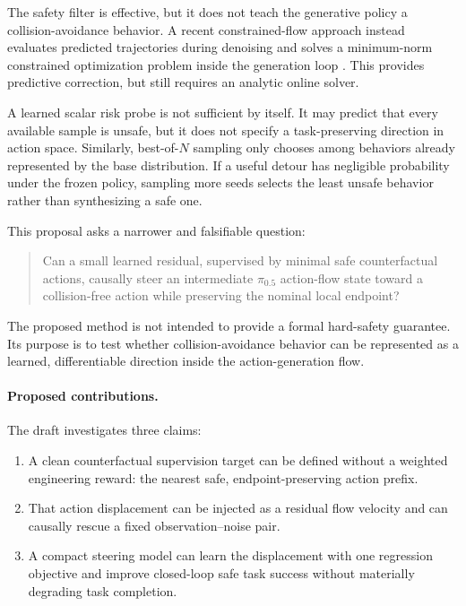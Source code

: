 \documentclass[10pt,conference]{IEEEtran}
\newcommand{\pizero}{\ensuremath{\pi_{0.5}}}
\newcommand{\1}{\mathbf{1}}
\begin{document}
The safety filter is effective, but it does not teach the generative policy a collision-avoidance behavior. A recent constrained-flow approach instead evaluates predicted trajectories during denoising and solves a minimum-norm constrained optimization problem inside the generation loop \cite{english2026constrained}. This provides predictive correction, but still requires an analytic online solver.

A learned scalar risk probe is not sufficient by itself. It may predict that every available sample is unsafe, but it does not specify a task-preserving direction in action space. Similarly, best-of-$N$ sampling only chooses among behaviors already represented by the base distribution. If a useful detour has negligible probability under the frozen policy, sampling more seeds selects the least unsafe behavior rather than synthesizing a safe one.

This proposal asks a narrower and falsifiable question:

\begin{quote}
Can a small learned residual, supervised by minimal safe counterfactual actions, causally steer an intermediate \pizero{} action-flow state toward a collision-free action while preserving the nominal local endpoint?
\end{quote}

The proposed method is not intended to provide a formal hard-safety guarantee. Its purpose is to test whether collision-avoidance behavior can be represented as a learned, differentiable direction inside the action-generation flow.

\paragraph{Proposed contributions.}
The draft investigates three claims:
\begin{enumerate}[leftmargin=*,nosep]
    \item A clean counterfactual supervision target can be defined without a weighted engineering reward: the nearest safe, endpoint-preserving action prefix.
    \item That action displacement can be injected as a residual flow velocity and can causally rescue a fixed observation--noise pair.
    \item A compact steering model can learn the displacement with one regression objective and improve closed-loop safe task success without materially degrading task completion.
\end{enumerate}
\end{document}
